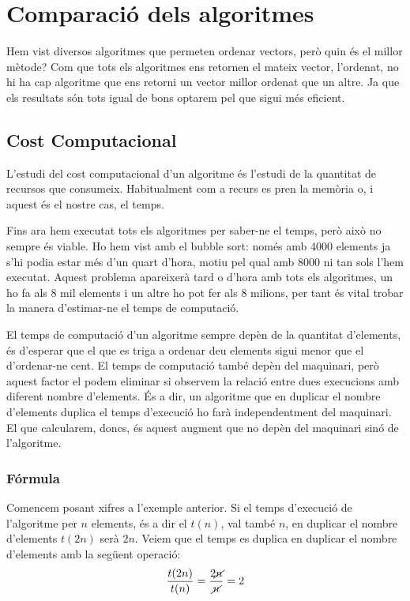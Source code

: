 \chapter{Comparació dels algoritmes}
Hem vist diversos algoritmes que permeten ordenar vectors, però quin és el millor mètode?
Com que tots els algoritmes ens retornen el mateix vector, l'ordenat, no hi ha cap algoritme que ens retorni un vector millor ordenat que un altre. Ja que els resultats són tots igual de bons optarem pel que sigui més eficient.

\section{Cost Computacional}
L'estudi del cost computacional d'un algoritme és l'estudi de la quantitat de recursos que consumeix. Habitualment com a recurs es pren la memòria o, i aquest és el nostre cas, el temps.

Fins ara hem executat tots els algoritmes per saber-ne el temps, però això no sempre és viable.
Ho hem vist amb el bubble sort: només amb 4000 elements ja s'hi podia estar més d'un quart d'hora, motiu pel qual amb 8000 ni tan sols l'hem executat.
Aquest problema apareixerà tard o d'hora amb tots els algoritmes, un ho fa als 8 mil elements i un altre ho pot fer als 8 milions, per tant és vital trobar la manera d'estimar-ne el temps de computació.

El temps de computació d'un algoritme sempre depèn de la quantitat d'elements, és d'esperar que el que es triga a ordenar deu elements sigui menor que el d'ordenar-ne cent.
El temps de computació també depèn del maquinari, però aquest factor el podem eliminar si observem la relació entre dues execucions amb diferent nombre d'elements.
És a dir, un algoritme que en duplicar el nombre d'elements duplica el temps d'execució ho farà independentment del maquinari.
El que calcularem, doncs, és aquest augment que no depèn del maquinari sinó de l'algoritme.

\subsection{Fórmula}
Comencem posant xifres a l'exemple anterior.
Si el temps d'execució de l'algoritme per $n$ elements, és a dir el $t(n)$, val també $n$, en duplicar el nombre d'elements $t(2n)$ serà $2n$.
Veiem que el temps es duplica en duplicar el nombre d'elements amb la següent operació:
\begin{gather*}
	\frac{t(2n)}{t(n)} = \frac{2 \cancel{n}}{ \cancel{n}} = 2
\end{gather*}

